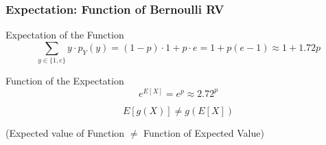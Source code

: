 \begin{frame}
\frametitle{Expectation: Function of Bernoulli RV}
\vspace{2em}



\begin{block}{Expectation of the Function}
$$\sum_{y \in \{1, e\}} y \cdot p_Y(y) = (1-p) \cdot 1 + p \cdot e = 1 + p(e - 1) \approx 1 + 1.72 p$$
\end{block}

\begin{block}{Function of the Expectation}
$$e^{E[X]} = e^p \approx 2.72^p$$
\end{block}



\end{frame}


\begin{frame}
\huge $$E[g(X)] \neq g(E[X])$$
\begin{center}
	\large (Expected value of Function $\neq$ Function of Expected Value)
\end{center}


\end{frame}

